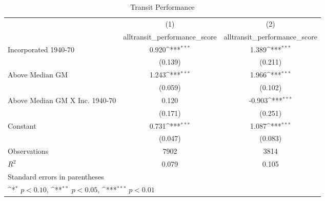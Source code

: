\begin{table}[htbp]\centering
\def\sym#1{\ifmmode^{#1}\else\(^{#1}\)\fi}
\caption{Transit Performance}
\begin{tabular}{l*{2}{c}}
\hline\hline
                    &\multicolumn{1}{c}{(1)}&\multicolumn{1}{c}{(2)}\\
                    &\multicolumn{1}{c}{alltransit\_performance\_score}&\multicolumn{1}{c}{alltransit\_performance\_score}\\
\hline
Incorporated 1940-70&       0.920\sym{***}&       1.389\sym{***}\\
                    &     (0.139)         &     (0.211)         \\
[1em]
Above Median GM     &       1.243\sym{***}&       1.966\sym{***}\\
                    &     (0.059)         &     (0.102)         \\
[1em]
Above Median GM X Inc. 1940-70&       0.120         &      -0.903\sym{***}\\
                    &     (0.171)         &     (0.251)         \\
[1em]
Constant            &       0.731\sym{***}&       1.087\sym{***}\\
                    &     (0.047)         &     (0.083)         \\
\hline
Observations        &        7902         &        3814         \\
\(R^{2}\)           &       0.079         &       0.105         \\
\hline\hline
\multicolumn{3}{l}{\footnotesize Standard errors in parentheses}\\
\multicolumn{3}{l}{\footnotesize \sym{*} \(p<0.10\), \sym{**} \(p<0.05\), \sym{***} \(p<0.01\)}\\
\end{tabular}
\end{table}
